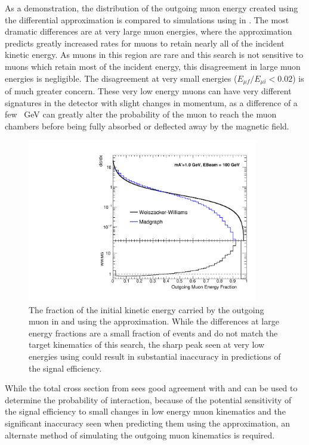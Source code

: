 As a demonstration, the distribution of the outgoing muon energy created using the differential \ww approximation is compared to simulations using \mg in . 
The most dramatic differences are at very large muon energies, where the \ww approximation predicts greatly increased rates for muons to retain nearly all of the incident kinetic energy.
As muons in this region are rare and this search is not sensitive to muons which retain most of the incident energy, this disagreement in large muon energies is negligible.
The disagreement at very small energies ($E_{\mu f}/E_{\mu i}<0.02$) is of much greater concern. 
These very low energy muons can have very different signatures in the detector with slight changes in momentum, as a difference of a few \SI{}{\giga\eV} can greatly alter the probability of the muon to reach the muon chambers before being fully absorbed or deflected away by the magnetic field.

\begin{figure}[htbp]
	\includegraphics[width=0.9\textwidth]{figures/wwXcomp.pdf}
	\caption[\ww and \mg Outgoing Energy]{The fraction of the initial kinetic energy carried by the outgoing muon in \mg and using the \ww approximation. While the differences at large energy fractions are a small fraction of events and do not match the target kinematics of this search, the sharp peak seen at very low energies using \ww could result in substantial inaccuracy in predictions of the signal efficiency.}
	\label{fig:wwMgComp}
\end{figure}

While the total cross section from \ww sees good agreement with \mg and can be used to determine the probability of interaction, because of the potential sensitivity of the signal efficiency to small changes in low energy muon kinematics and the significant inaccuracy seen when predicting them using the \ww approximation, an alternate method of simulating the outgoing muon kinematics is required.

